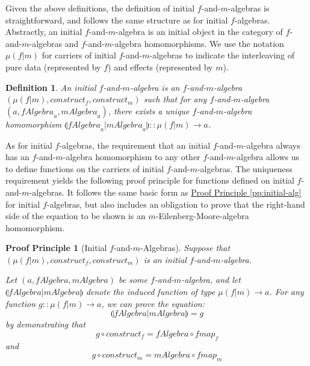\documentclass{jfp1}
\newcommand{\eFold}[2]{\llparenthesis #1|#2 \rrparenthesis}
\newtheorem{definition}{Definition}
\newtheorem{proofprinciple}{Proof Principle}
\newcommand{\proofprinref}[1]{\hyperref[#1]{Proof Principle \ref*{#1}}}
\begin{document}
Given the above definitions, the definition of initial
$f$-and-$m$-algebras is straightforward, and follows the same
structure as for initial $f$-algebras. Abstractly, an initial
$f$-and-$m$-algebra is an initial object in the category of
$f$-and-$m$-algebras and $f$-and-$m$-algebra homomorphisms. We use the
notation $\mu(f|m)$ for carriers of initial $f$-and-$m$-algebras to
indicate the interleaving of pure data (represented by $f$) and
effects (represented by $m$).

\begin{definition}
  An \emph{initial $f$-and-$m$-algebra} is an $f$-and-$m$-algebra
  $(\mu(f|m), \mathit{construct}_f, \mathit{construct}_m)$ such that
  for any $f$-and-$m$-algebra $(a, \mathit{fAlgebra}_a,
  \mathit{mAlgebra}_a)$, there exists a unique $f$-and-$m$-algebra
  homomorphism $\eFold{\mathit{fAlgebra}_a}{\mathit{mAlgebra}_a} ::
  \mu(f|m) \to a$.
\end{definition}

As for initial $f$-algebras, the requirement that an initial
$f$-and-$m$-algebra always has an $f$-and-$m$-algebra homomorphism to
any other $f$-and-$m$-algebra allows us to define functions on the
carriers of initial $f$-and-$m$-algebras. The uniqueness requirement
yields the following proof principle for functions defined on initial
$f$-and-$m$-algebras. It follows the same basic form as
\proofprinref{pp:initial-alg} for initial $f$-algebras, but also
includes an obligation to prove that the right-hand side of the
equation to be shown is an $m$-Eilenberg-Moore-algebra
homomorphism.

\begin{proofprinciple}[Initial $f$-and-$m$-Algebras]
  \label{pp:initial-f-m-alg}
  Suppose that $(\mu(f|m), \mathit{construct}_f, \mathit{construct}_m)$ is an
  initial $f$-and-$m$-algebra. 

  Let $(a, \mathit{fAlgebra}, \mathit{mAlgebra})$ be some
  $f$-and-$m$-algebra, and let
  $\eFold{\mathit{fAlgebra}}{\mathit{mAlgebra}}$ denote the induced
  function of type $\mu(f|m) \to a$. For any function $g :: \mu(f|m)
  \to a$, we can prove the equation:
  \begin{displaymath}
    \eFold{\mathit{fAlgebra}}{\mathit{mAlgebra}} = g
  \end{displaymath}
  by demonstrating that
  \begin{equation}\label{eq:fm-falg}
    g \circ \mathit{construct}_f = \mathit{fAlgebra} \circ \mathit{fmap}_f
  \end{equation}
  and
  \begin{equation}\label{eq:fm-malg}
    g \circ \mathit{construct}_m = \mathit{mAlgebra} \circ \mathit{fmap}_m
  \end{equation}
\end{proofprinciple}
\end{document}
